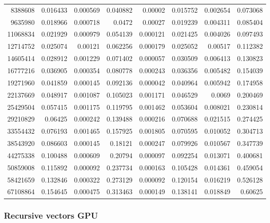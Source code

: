 \begin{tabular}{r r r r r r r r}
8388608 & 0.016433 & 0.000569 & 0.040882 & 0.00002 & 0.015752 & 0.002654 & 0.073068 \\
9635980 & 0.018966 & 0.000718 & 0.0472 & 0.00027 & 0.019239 & 0.004311 & 0.085404 \\
11068834 & 0.021929 & 0.000979 & 0.054139 & 0.000121 & 0.021425 & 0.004026 & 0.097493 \\
12714752 & 0.025074 & 0.00121 & 0.062256 & 0.000179 & 0.025052 & 0.00517 & 0.112382 \\
14605414 & 0.028912 & 0.001229 & 0.071402 & 0.000057 & 0.030509 & 0.006413 & 0.130823 \\
16777216 & 0.036905 & 0.000354 & 0.080778 & 0.000243 & 0.036356 & 0.005482 & 0.154039 \\
19271960 & 0.041859 & 0.000145 & 0.092136 & 0.000042 & 0.040964 & 0.005942 & 0.174958 \\
22137669 & 0.048917 & 0.001087 & 0.105023 & 0.001171 & 0.046529 & 0.0069 & 0.200469 \\
25429504 & 0.057415 & 0.001175 & 0.119795 & 0.001462 & 0.053604 & 0.008021 & 0.230814 \\
29210829 & 0.06425 & 0.000242 & 0.139488 & 0.000216 & 0.070688 & 0.021515 & 0.274425 \\
33554432 & 0.076193 & 0.001465 & 0.157925 & 0.001805 & 0.070595 & 0.010052 & 0.304713 \\
38543920 & 0.086603 & 0.000145 & 0.18121 & 0.000247 & 0.079926 & 0.010567 & 0.347739 \\
44275338 & 0.100488 & 0.000609 & 0.20794 & 0.000097 & 0.092254 & 0.013071 & 0.400681 \\
50859008 & 0.115892 & 0.000092 & 0.237734 & 0.000163 & 0.105428 & 0.014361 & 0.459054 \\
58421659 & 0.132846 & 0.000322 & 0.273129 & 0.000092 & 0.120154 & 0.016219 & 0.526128 \\
67108864 & 0.154645 & 0.000475 & 0.313463 & 0.000149 & 0.138141 & 0.018849 & 0.60625 \\
\end{tabular}

\subsubsection{Recursive vectors GPU}


